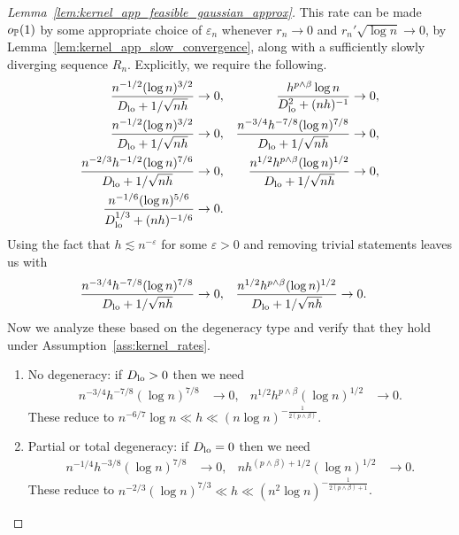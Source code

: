 \begin{proof}[Lemma~\ref{lem:kernel_app_feasible_gaussian_approx}]

  This rate can be made $o_\P(1)$
  by some appropriate choice of $\varepsilon_n$
  whenever
  $r_n \to 0$ and $r_n' \sqrt{\log n} \to 0$,
  by Lemma~\ref{lem:kernel_app_slow_convergence}, along with
  a sufficiently slowly diverging sequence $R_n$.
  Explicitly, we require the following.
  \begin{align*}
    \frac{n^{-1/2} (\log n)^{3/2}}{\Dl + 1/\sqrt{n h}}
    &\to 0,
    &\frac{h^{p \wedge \beta} \log n}{\Dl^2 + (n h)^{-1}}
    &\to 0, \\
    \frac{n^{-1/2} (\log n)^{3/2}}
    {\Dl + 1/\sqrt{n h}}
    &\to 0,
    &\frac{n^{-3/4} h^{-7/8} (\log n)^{7/8}}
    {\Dl + 1/\sqrt{n h}}
    &\to 0, \\
    \frac{n^{-2/3} h^{-1/2} (\log n)^{7/6}}
    {\Dl + 1/\sqrt{n h}}
    &\to 0,
    &\frac{n^{1/2} h^{p \wedge \beta} (\log n)^{1/2}}
    {\Dl + 1/\sqrt{n h}}
    &\to 0, \\
    \frac{n^{-1/6}(\log n)^{5/6}}
    {\Dl^{1/3} + (n h)^{-1/6}}
    &\to 0.
  \end{align*}
  Using the fact that $h \lesssim n^{-\varepsilon}$
  for some $\varepsilon > 0$
  and removing trivial statements leaves us with
  \begin{align*}
    \frac{n^{-3/4} h^{-7/8} (\log n)^{7/8}}
    {\Dl + 1/\sqrt{n h}}
    &\to 0,
    &\frac{n^{1/2} h^{p \wedge \beta} (\log n)^{1/2}}
    {\Dl + 1/\sqrt{n h}}
    &\to 0.
  \end{align*}
  Now we analyze these based on the degeneracy type
  and verify that they hold under
  Assumption~\ref{ass:kernel_rates}.
  \begin{enumerate}[label=(\roman*)]

    \item No degeneracy:
      if $\Dl > 0$ then we need
      \begin{align*}
        n^{-3/4} h^{-7/8} (\log n)^{7/8}
        &\to 0,
        &n^{1/2} h^{p \wedge \beta} (\log n)^{1/2}
        &\to 0.
      \end{align*}
      These reduce to
      $n^{-6/7} \log n \ll h
      \ll (n \log n)^{-\frac{1}{2(p \wedge \beta)}}$.

    \item Partial or total degeneracy:
      if $\Dl = 0$ then we need
      \begin{align*}
        n^{-1/4} h^{-3/8} (\log n)^{7/8}
        &\to 0,
        &n h^{(p \wedge \beta) + 1/2} (\log n)^{1/2}
        &\to 0.
      \end{align*}
      These reduce to
      $n^{-2/3} (\log n)^{7/3} \ll h
      \ll (n^2 \log n)^{-\frac{1}{2(p \wedge \beta) + 1}}$.

  \end{enumerate}
\end{proof}

